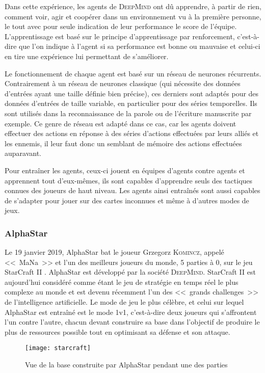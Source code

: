 Dans cette expérience, les agents de \textsc{DeepMind} ont dû apprendre, à partir de rien, comment voir, agir et coopérer dans un environnement vu à la première personne, le tout avec pour seule indication de leur performance le score de l'équipe.
L'apprentissage est basé sur le principe d'apprentissage par renforcement, c’est-à-dire que l'on indique à l'agent si sa performance est bonne ou mauvaise et celui-ci en tire une expérience lui permettant de s'améliorer.

Le fonctionnement de chaque agent est basé sur un réseau de neurones récurrents.
Contrairement à un réseau de neurones classique (qui nécessite des données d'entrées ayant une taille définie bien précise), ces derniers sont adaptés pour des données d'entrées de taille variable, en particulier pour des séries temporelles.
Ils sont utilisés dans la reconnaissance de la parole ou de l'écriture manuscrite par exemple.
Ce genre de réseau est adapté dans ce cas, car les agents doivent effectuer des actions en réponse à des séries d'actions effectuées par leurs alliés et les ennemis, il leur faut donc un semblant de mémoire des actions effectuées auparavant.

Pour entraîner les agents, ceux-ci jouent en équipes d'agents contre agents et apprennent tout d'eux-mêmes, ils sont capables d'apprendre seuls des tactiques connues des joueurs de haut niveau.
Les agents ainsi entraînés sont aussi capables de s'adapter pour jouer sur des cartes inconnues et même à d'autres modes de jeux.

\subsubsection{AlphaStar}

Le 19 janvier 2019, AlphaStar bat le joueur Grzegorz \textsc{Komincz}, appelé <<~MaNa~>> et l'un des meilleurs joueurs du monde, 5 parties à 0, sur le jeu StarCraft II \cite{alphastar}.
AlphaStar est développé par la société \textsc{DeepMind}.
StarCraft II est aujourd'hui considéré comme étant le jeu de stratégie en temps réel le plus complexe au monde et est devenu récemment l'un des <<~grands challenges~>> de l'intelligence artificielle.
Le mode de jeu le plus célèbre, et celui sur lequel AlphaStar est entraîné est le mode 1v1, c'est-à-dire deux joueurs qui s'affrontent l'un contre l'autre, chacun devant construire sa base dans l'objectif de produire le plus de ressources possible tout en optimisant sa défense et son attaque.

\FloatBarrier
\begin{figure}[h!]
    \begin{center}
        \texttt{[image: starcraft]}
    \end{center}
    \caption{Vue de la base construite par AlphaStar pendant une des parties}
    \label{figure:starcraft}
\end{figure}
\FloatBarrier

